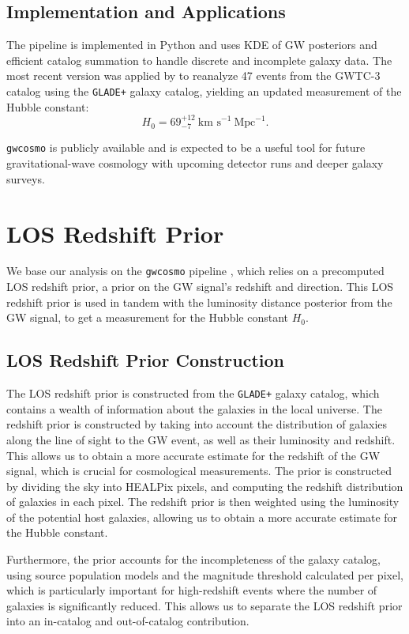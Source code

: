 \subsection{Implementation and Applications}

The pipeline is implemented in Python and uses \ac{KDE} of \ac{GW} posteriors and efficient catalog summation to handle discrete and incomplete galaxy data. The most recent version was applied by \cite{gray2023joint} to reanalyze 47 events from the \ac{GWTC}-3 catalog using the \texttt{GLADE+} galaxy catalog, yielding an updated measurement of the Hubble constant:
$$
H_0 = 69^{+12}_{-7}~\text{km s}^{-1}~\text{Mpc}^{-1}.
$$

\texttt{gwcosmo} is publicly available and is expected to be a useful tool for future gravitational-wave cosmology with upcoming detector runs and deeper galaxy surveys.

\section{\ac{LOS} Redshift Prior}
We base our analysis on the \texttt{gwcosmo} pipeline \citep{gray2020cosmological,gray2022pixelated,gray2023joint}, which relies on a precomputed \ac{LOS} redshift prior, a prior on the \ac{GW} signal's redshift and direction. This \ac{LOS} redshift prior is used in tandem with the luminosity distance posterior from the \ac{GW} signal, to get a measurement for the Hubble constant $H_0$.

\subsection{\ac{LOS} Redshift Prior Construction}
The \ac{LOS} redshift prior is constructed from the \texttt{GLADE+} galaxy catalog, which contains a wealth of information about the galaxies in the local universe. The redshift prior is constructed by taking into account the distribution of galaxies along the line of sight to the \ac{GW} event, as well as their luminosity and redshift. This allows us to obtain a more accurate estimate for the redshift of the \ac{GW} signal, which is crucial for cosmological measurements. The prior is constructed by dividing the sky into HEALPix pixels, and computing the redshift distribution of galaxies in each pixel. The redshift prior is then weighted using the luminosity of the potential host galaxies, allowing us to obtain a more accurate estimate for the Hubble constant.

Furthermore, the prior accounts for the incompleteness of the galaxy catalog, using source population models and the magnitude threshold calculated per pixel, which is particularly important for high-redshift events where the number of galaxies is significantly reduced. This allows us to separate the \ac{LOS} redshift prior into an in-catalog and out-of-catalog contribution.

